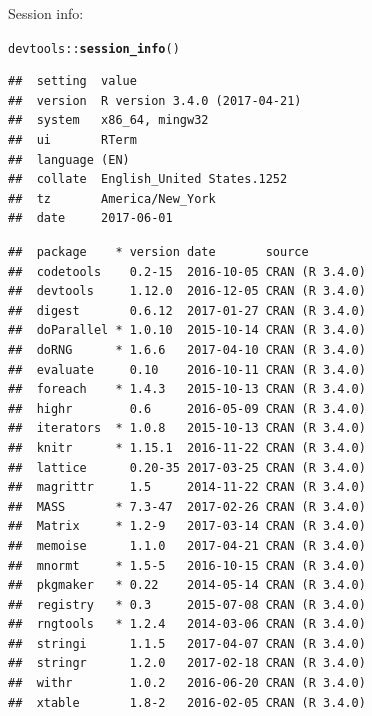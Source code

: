 \documentclass{article}\usepackage[]{graphicx}\usepackage[]{color}
\makeatletter
\newcommand{\hlopt}[1]{\textcolor[rgb]{0,0,0}{#1}}%
\newcommand{\hlstd}[1]{\textcolor[rgb]{0.345,0.345,0.345}{#1}}%
\newcommand{\hlkwd}[1]{\textcolor[rgb]{0.737,0.353,0.396}{\textbf{#1}}}%
\newenvironment{kframe}{%
 \def\at@end@of@kframe{}%
 \ifinner\ifhmode%
  \def\at@end@of@kframe{\end{minipage}}%
  \begin{minipage}{\columnwidth}%
 \fi\fi%
 \def\FrameCommand##1{\hskip\@totalleftmargin \hskip-\fboxsep
 \colorbox{shadecolor}{##1}\hskip-\fboxsep
     \hskip-\linewidth \hskip-\@totalleftmargin \hskip\columnwidth}%
 \MakeFramed {\advance\hsize-\width
   \@totalleftmargin\z@ \linewidth\hsize
   \@setminipage}}%
 {\par\unskip\endMakeFramed%
 \at@end@of@kframe}
\newenvironment{knitrout}{}{} %
\makeatother
\begin{document}
Session info:
\begin{knitrout}
\color{fgcolor}\begin{kframe}
\begin{alltt}
\hlstd{devtools}\hlopt{::}\hlkwd{session_info}\hlstd{()}
\end{alltt}


{\ttfamily\noindent\itshape\color{messagecolor}{\#\# Session info -----------------------------------------------}}\begin{verbatim}
##  setting  value                       
##  version  R version 3.4.0 (2017-04-21)
##  system   x86_64, mingw32             
##  ui       RTerm                       
##  language (EN)                        
##  collate  English_United States.1252  
##  tz       America/New_York            
##  date     2017-06-01
\end{verbatim}


{\ttfamily\noindent\itshape\color{messagecolor}{\#\# Packages ---------------------------------------------------}}\begin{verbatim}
##  package    * version date       source        
##  codetools    0.2-15  2016-10-05 CRAN (R 3.4.0)
##  devtools     1.12.0  2016-12-05 CRAN (R 3.4.0)
##  digest       0.6.12  2017-01-27 CRAN (R 3.4.0)
##  doParallel * 1.0.10  2015-10-14 CRAN (R 3.4.0)
##  doRNG      * 1.6.6   2017-04-10 CRAN (R 3.4.0)
##  evaluate     0.10    2016-10-11 CRAN (R 3.4.0)
##  foreach    * 1.4.3   2015-10-13 CRAN (R 3.4.0)
##  highr        0.6     2016-05-09 CRAN (R 3.4.0)
##  iterators  * 1.0.8   2015-10-13 CRAN (R 3.4.0)
##  knitr      * 1.15.1  2016-11-22 CRAN (R 3.4.0)
##  lattice      0.20-35 2017-03-25 CRAN (R 3.4.0)
##  magrittr     1.5     2014-11-22 CRAN (R 3.4.0)
##  MASS       * 7.3-47  2017-02-26 CRAN (R 3.4.0)
##  Matrix     * 1.2-9   2017-03-14 CRAN (R 3.4.0)
##  memoise      1.1.0   2017-04-21 CRAN (R 3.4.0)
##  mnormt     * 1.5-5   2016-10-15 CRAN (R 3.4.0)
##  pkgmaker   * 0.22    2014-05-14 CRAN (R 3.4.0)
##  registry   * 0.3     2015-07-08 CRAN (R 3.4.0)
##  rngtools   * 1.2.4   2014-03-06 CRAN (R 3.4.0)
##  stringi      1.1.5   2017-04-07 CRAN (R 3.4.0)
##  stringr      1.2.0   2017-02-18 CRAN (R 3.4.0)
##  withr        1.0.2   2016-06-20 CRAN (R 3.4.0)
##  xtable       1.8-2   2016-02-05 CRAN (R 3.4.0)
\end{verbatim}
\end{kframe}
\end{knitrout}
\end{document}
